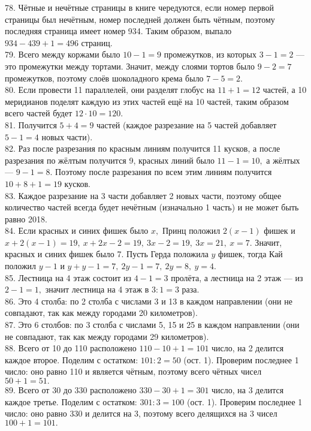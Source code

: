 78. Чётные и нечётные страницы в книге чередуются, если номер первой страницы был нечётным, номер последней должен быть чётным, поэтому последняя страница имеет номер 934. Таким образом, выпало $934-439+1=496$ страниц.\\
79. Всего между коржами было $10-1=9$ промежутков, из которых $3-1=2$ --- это промежутки между тортами. Значит, между слоями тортов было $9-2=7$ промежутков, поэтому слоёв шоколадного крема было $7-5=2.$\\
80. Если провести 11 параллелей, они разделят глобус на $11+1=12$ частей, а 10 меридианов поделят каждую из этих частей ещё на 10 частей, таким образом всего частей будет $12\cdot10=120.$\\
81. Получится $5+4=9$ частей (каждое разрезание на 5 частей добавляет $5-1=4$ новых части).\\
82. Раз после разрезания по красным линиям получится 11 кусков, а после разрезания по жёлтым получится 9, красных линий было $11-1=10,$ а жёлтых --- $9-1=8.$ Поэтому после разрезания по всем этим линиям получится $10+8+1=19$ кусков.\\
83. Каждое разрезание на 3 части добавляет 2 новых части, поэтому общее количество частей всегда будет нечётным (изначально 1 часть) и не может быть равно 2018.\\
84. Если красных и синих фишек было $x,$ Принц положил $2(x-1)$ фишек и $x+2(x-1)=19,\ x+2x-2=19,\ 3x-2=19,\ 3x=21,\ x=7.$ Значит, красных и синих фишек было 7. Пусть Герда положила $y$ фишек, тогда Кай положил $y-1$ и $y+y-1=7,\ 2y-1=7,\ 2y=8,\ y=4.$\\
85. Лестница на 4 этаж состоит из $4-1=3$ пролёта, а лестница на 2 этаж --- из $2-1=1,$ значит лестница на 4 этаж в $3:1=3$ раза.\\
86. Это 4 столба: по 2 столба с числами 3 и 13 в каждом направлении (они не совпадают, так как между городами 20 километров).\\
87. Это 6 столбов: по 3 столба с числами 5, 15 и 25 в каждом направлении (они не совпадают, так как между городами 29 километров).\\
88. Всего от 10 до 110 расположено $110-10+1=101$ число, на 2 делится каждое второе. Поделим с остатком: $101:2=50$ (ост. 1). Проверим последнее 1 число: оно равно 110 и является чётным, поэтому всего чётных чисел $50+1=51.$\\
89. Всего от 30 до 330 расположено $330-30+1=301$ число, на 3 делится каждое третье. Поделим с остатком: $301:3=100$ (ост. 1). Проверим последнее 1 число: оно равно 330 и делится на 3, поэтому всего делящихся на 3 чисел $100+1=101.$\\
